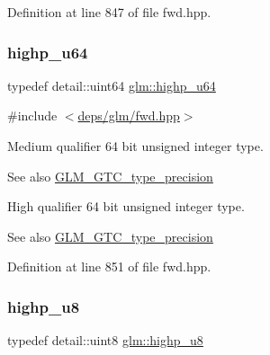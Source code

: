 Definition at line 847 of file fwd.\+hpp.

\mbox{\label{group__gtc__type__precision_ga6006ea883d3c0491791650b2fb84de39}} 
\subsubsection{\texorpdfstring{highp\+\_\+u64}{highp\_u64}}
{\footnotesize\ttfamily typedef detail\+::uint64 \hyperlink{group__gtc__type__precision_ga6006ea883d3c0491791650b2fb84de39}{glm\+::highp\+\_\+u64}}



{\ttfamily \#include $<$\hyperlink{fwd_8hpp}{deps/glm/fwd.\+hpp}$>$}

Medium qualifier 64 bit unsigned integer type. \begin{DoxySeeAlso}{See also}
\hyperlink{group__gtc__type__precision}{G\+L\+M\+\_\+\+G\+T\+C\+\_\+type\+\_\+precision}
\end{DoxySeeAlso}
High qualifier 64 bit unsigned integer type. \begin{DoxySeeAlso}{See also}
\hyperlink{group__gtc__type__precision}{G\+L\+M\+\_\+\+G\+T\+C\+\_\+type\+\_\+precision} 
\end{DoxySeeAlso}


Definition at line 851 of file fwd.\+hpp.

\mbox{\label{group__gtc__type__precision_ga8a60abe782749c504fb5ae51eb8b49cc}} 
\subsubsection{\texorpdfstring{highp\+\_\+u8}{highp\_u8}}
{\footnotesize\ttfamily typedef detail\+::uint8 \hyperlink{group__gtc__type__precision_ga8a60abe782749c504fb5ae51eb8b49cc}{glm\+::highp\+\_\+u8}}



